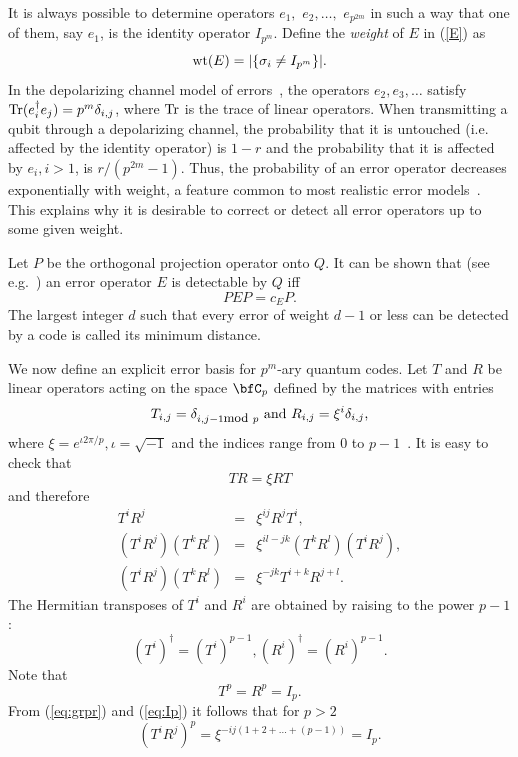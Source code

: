 \documentclass{article}
\def\wt{\qopname\relax{no}{wt}}
\def\Tr{\qopname\relax{no}{Tr}}
\begin{document}
It is always possible to determine operators $e_1,$ $e_2, \ldots,$
$e_{p^{2m}}$ in such a way that one of them, say $e_1$, is the
identity operator $I_{p^m}$. Define the {\em weight} of $E$ in
(\ref{E}) as
\begin{equation}\label{wt}
\wt(E)=|\{ \sigma_i\not =I_{p^m}\}|.
\end{equation}
In the depolarizing channel model of errors~\cite{bennett96}, the
operators $e_2,e_3,\ldots$ satisfy $\Tr(e_i^\dagger e_j) =
p^m\delta_{i,j}$, where $\Tr$ is the trace of linear operators. When
transmitting a qubit through a depolarizing channel, the probability
that it is untouched (i.e. affected by the identity operator) is $1-r$
and the probability that it is affected by $e_i,i>1$, is
$r/(p^{2m}-1)$.  Thus, the probability of an error operator decreases
exponentially with weight, a feature common to most realistic error
models~\cite{knill99}. This explains why it is desirable to correct or
detect all error operators up to some given weight.

Let $P$ be the orthogonal projection operator onto $Q$.  It can be
shown that (see e.g.~\cite{Knill96_1}) an error operator $E$ is
detectable by $Q$ iff
\begin{equation}\label{eq:err}
PEP=c_E P. 
\end{equation}
The largest integer $d$ such that every error of weight $d-1$ or less
can be detected by a code is called its minimum distance.

We now define an explicit error basis for $p^m$-ary quantum codes. Let
$T$ and $R$ be linear operators acting on the space $\bfC_{p}$ defined
by the matrices with entries
$$
T_{i,j}=\delta_{i,j-1 \mbox{\small mod }p} \mbox{ and } R_{i,j}=\xi^i\delta_{i,j},
$$
where $\xi=e^{ \iota  2\pi/ p}, \iota=\sqrt{-1}$ and the indices
range from $0$ to $p-1$~\cite{Knill96_1}. 
It is easy to check that
$$
TR=\xi RT
$$
and therefore 
\begin{eqnarray}
T^iR^j&=&\xi^{ij}R^jT^i,\\
\label{eq:pro}
\left(T^iR^j\right)\left(T^kR^l\right)
  &=&\xi^{il-jk}\left(T^kR^l\right)\left(T^iR^j \right),\\
\label{eq:grpr}
\left(T^iR^j\right)\left(T^kR^l\right)&=&\xi^{-jk} T^{i+k}R^{j+l}.
\end{eqnarray}
The Hermitian transposes of $T^i$ and $R^i$ are obtained by raising to the
power $p-1$:
\begin{equation}\label{eq:dag}
(T^i)^\dag =(T^i)^{p-1}, (R^i)^\dag =(R^i)^{p-1}.
\end{equation}
Note that 
\begin{equation}\label{eq:Ip}
T^p=R^p=I_p.
\end{equation}
From (\ref{eq:grpr}) and (\ref{eq:Ip}) it follows that for $p>2$ 
\begin{equation}\label{eq:p_power}
(T^iR^j)^p=\xi^{-ij(1+2+\ldots +(p-1))}=I_p.
\end{equation}
\end{document}
